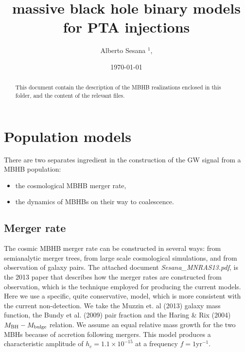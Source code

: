 \documentclass[prd,aps,eqsecnum]{revtex4}
\begin{document}
\title{massive black hole binary models for PTA injections}

\author{Alberto Sesana $^{1}$,}
\vspace{0.4cm}




\date{\today}

\begin{abstract}
  This document contain the description of the MBHB realizations enclosed in this folder, and the content of the relevant files. 
\end{abstract}

\maketitle

\section{Population models}
There are two separates ingredient in the construction of the GW signal from a MBHB population:
\begin{itemize}
\item the cosmological MBHB merger rate,
\item the dynamics of MBHBs on their way to coalescence.
\end{itemize}
\subsection{Merger rate}
The cosmic MBHB merger rate can be constructed in several ways: from semianalytic merger trees, from large scale cosmological simulations, and from observation of galaxy pairs. The attached document {\it Sesana\_MNRAS13.pdf}, is the 2013 paper that describes how the merger rates are constructed from observation, which is the technique employed for producing the current models. Here we use a specific, quite conservative, model, which is more consistent with the current non-detection. We take the Muzzin et. al (2013) galaxy mass function, the Bundy et al. (2009) pair fraction and the Haring \& Rix (2004) $M_{\rm BH}-M_{\rm bulge}$ relation. We assume an equal relative mass growth for the two MBHs because of accretion following mergers. This model produces a characteristic amplitude of $h_c=1.1\times10^{-15}$ at a frequency $f=1$yr$^{-1}$.
\end{document}
